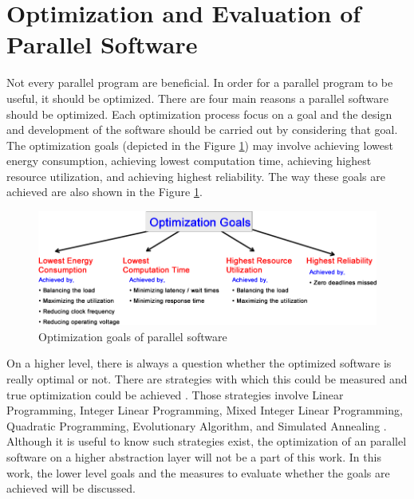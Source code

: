 \section{Optimization and Evaluation of Parallel Software} \label{opt}
Not every parallel program are beneficial. In order for a parallel program to be useful, it should be optimized. There are four main reasons a parallel software should be optimized. Each optimization process focus on a goal and the design and development of the software should be carried out by considering that goal. The optimization goals (depicted in the Figure \ref{fig:optimization2})  may involve achieving lowest energy consumption, achieving lowest computation time, achieving highest resource utilization, and achieving highest reliability. The way these goals are achieved are also shown in the Figure \ref{fig:optimization2}. 

\begin{figure}[!ht]
	\centering
	\captionsetup{justification=centering}
	\includegraphics[width=\textwidth]{content/images/optimization2.png}
	\caption{Optimization goals of parallel software}
	\label{fig:optimization2}
\end{figure}

On a higher level, there is always a question whether the optimized software is really optimal or not. There are strategies with which this could be measured and true optimization could be achieved \cite{lukas1}. Those strategies involve Linear Programming, Integer Linear Programming, Mixed Integer Linear Programming, Quadratic Programming, Evolutionary Algorithm, and Simulated Annealing \cite{lukas1}. Although it is useful to know such strategies exist, the optimization of an parallel software on a higher abstraction layer will not be a part of this work. In this work, the lower level goals and the measures to evaluate whether the goals are achieved will be discussed.

